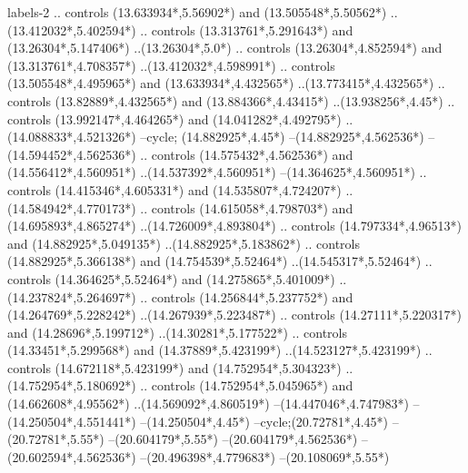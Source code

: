 {\begin{scope}[x=1mm,y=1mm,line width=\SCstroke mm,line cap=round,line join=round]
\begin{SCpart}{labels-2}
.. controls ({13.633934*\SCF},{5.56902*\SCF}) and ({13.505548*\SCF},{5.50562*\SCF}) ..({13.412032*\SCF},{5.402594*\SCF})
.. controls ({13.313761*\SCF},{5.291643*\SCF}) and ({13.26304*\SCF},{5.147406*\SCF}) ..({13.26304*\SCF},{5.0*\SCF})
.. controls ({13.26304*\SCF},{4.852594*\SCF}) and ({13.313761*\SCF},{4.708357*\SCF}) ..({13.412032*\SCF},{4.598991*\SCF})
.. controls ({13.505548*\SCF},{4.495965*\SCF}) and ({13.633934*\SCF},{4.432565*\SCF}) ..({13.773415*\SCF},{4.432565*\SCF})
.. controls ({13.82889*\SCF},{4.432565*\SCF}) and ({13.884366*\SCF},{4.43415*\SCF}) ..({13.938256*\SCF},{4.45*\SCF})
.. controls ({13.992147*\SCF},{4.464265*\SCF}) and ({14.041282*\SCF},{4.492795*\SCF}) ..({14.088833*\SCF},{4.521326*\SCF})
--cycle;
 ({14.882925*\SCF},{4.45*\SCF})
--({14.882925*\SCF},{4.562536*\SCF})
--({14.594452*\SCF},{4.562536*\SCF})
.. controls ({14.575432*\SCF},{4.562536*\SCF}) and ({14.556412*\SCF},{4.560951*\SCF}) ..({14.537392*\SCF},{4.560951*\SCF})
--({14.364625*\SCF},{4.560951*\SCF})
.. controls ({14.415346*\SCF},{4.605331*\SCF}) and ({14.535807*\SCF},{4.724207*\SCF}) ..({14.584942*\SCF},{4.770173*\SCF})
.. controls ({14.615058*\SCF},{4.798703*\SCF}) and ({14.695893*\SCF},{4.865274*\SCF}) ..({14.726009*\SCF},{4.893804*\SCF})
.. controls ({14.797334*\SCF},{4.96513*\SCF}) and ({14.882925*\SCF},{5.049135*\SCF}) ..({14.882925*\SCF},{5.183862*\SCF})
.. controls ({14.882925*\SCF},{5.366138*\SCF}) and ({14.754539*\SCF},{5.52464*\SCF}) ..({14.545317*\SCF},{5.52464*\SCF})
.. controls ({14.364625*\SCF},{5.52464*\SCF}) and ({14.275865*\SCF},{5.401009*\SCF}) ..({14.237824*\SCF},{5.264697*\SCF})
.. controls ({14.256844*\SCF},{5.237752*\SCF}) and ({14.264769*\SCF},{5.228242*\SCF}) ..({14.267939*\SCF},{5.223487*\SCF})
.. controls ({14.27111*\SCF},{5.220317*\SCF}) and ({14.28696*\SCF},{5.199712*\SCF}) ..({14.30281*\SCF},{5.177522*\SCF})
.. controls ({14.33451*\SCF},{5.299568*\SCF}) and ({14.37889*\SCF},{5.423199*\SCF}) ..({14.523127*\SCF},{5.423199*\SCF})
.. controls ({14.672118*\SCF},{5.423199*\SCF}) and ({14.752954*\SCF},{5.304323*\SCF}) ..({14.752954*\SCF},{5.180692*\SCF})
.. controls ({14.752954*\SCF},{5.045965*\SCF}) and ({14.662608*\SCF},{4.95562*\SCF}) ..({14.569092*\SCF},{4.860519*\SCF})
--({14.447046*\SCF},{4.747983*\SCF})
--({14.250504*\SCF},{4.551441*\SCF})
--({14.250504*\SCF},{4.45*\SCF})
--cycle; ({20.72781*\SCF},{4.45*\SCF})
--({20.72781*\SCF},{5.55*\SCF})
--({20.604179*\SCF},{5.55*\SCF})
--({20.604179*\SCF},{4.562536*\SCF})
--({20.602594*\SCF},{4.562536*\SCF})
--({20.496398*\SCF},{4.779683*\SCF})
--({20.108069*\SCF},{5.55*\SCF})

\end{SCpart}
\end{scope}}
